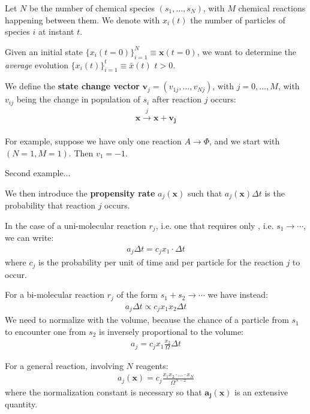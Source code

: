 \documentclass[../template.tex]{subfiles}
\begin{document}
Let $N$ be the number of chemical species $(s_1, \dots, s_N)$, with $M$ chemical reactions happening between them. We denote with $x_i(t)$ the number of particles of species $i$ at instant $t$.

\medskip

Given an initial state $\{x_i(t=0)\}_{i=1}^N \equiv \bm{x}(t=0)$, we want to determine the \textit{average}  evolution $\{x_i(t)\}_{i=1}^t \equiv \bar{x}(t)$ $t>0$.

\medskip

We define the \textbf{state change vector} $\bm{v}_{j} = (v_{1j}, \dots, v_{Nj})$, with $j = 0,\dots,M$, with $v_{ij}$ being the change in population of $s_i$ after reaction $j$ occurs:
\begin{align*}
    \bm{x} \xrightarrow[]{j} \bm{x} + \bm{v_j}
\end{align*}

For example, suppose we have only one reaction $A \to \Phi$, and we start with $(N=1, M=1)$. Then $v_1 = -1$. 

Second example...

\medskip

We then introduce the \textbf{propensity rate} $a_j(\bm{x})$ such that $a_j(\bm{x}) \Delta t$ is the probability that reaction $j$ occurs. 

In the case of a uni-molecular reaction $r_j$, i.e. one that requires only , i.e. $s_1 \to \cdots$, we can write:
\begin{align*}
    a_j \Delta t = c_j x_1 \cdot \Delta t 
\end{align*}
where $c_j$ is the probability per unit of time and per particle for the reaction $j$ to occur. 

\medskip

For a bi-molecular reaction $r_j$ of the form $s_1 + s_2 \to \cdots$ we have instead:
\begin{align*}
    a_j \Delta t \propto c_j x_1 x_2 \Delta t 
\end{align*}
We need to normalize with the volume, because the chance of a particle from $s_1$ to encounter one from $s_2$ is inversely proportional to the volume:
\begin{align*}
    a_j = c_j x_1 \frac{x_2}{\Omega}  \Delta t
\end{align*}

For a general reaction, involving $N$ reagents:
\begin{align*}
    a_j(\bm{x}) = c_j \frac{x_1 x_2 \cdot \dots \cdot x_N}{\Omega^{N-2}}
\end{align*}
where the normalization constant is necessary so that $\bm{a_j}(\bm{x})$ is an extensive quantity.
\end{document}
